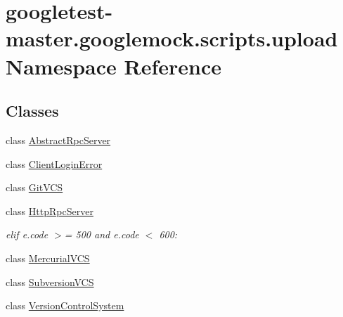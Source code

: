 \hypertarget{namespacegoogletest-master_1_1googlemock_1_1scripts_1_1upload}{}\section{googletest-\/master.googlemock.\+scripts.\+upload Namespace Reference}
\label{namespacegoogletest-master_1_1googlemock_1_1scripts_1_1upload}
\subsection*{Classes}
\begin{DoxyCompactItemize}
\item 
class \mbox{\hyperlink{classgoogletest-master_1_1googlemock_1_1scripts_1_1upload_1_1_abstract_rpc_server}{Abstract\+Rpc\+Server}}
\item 
class \mbox{\hyperlink{classgoogletest-master_1_1googlemock_1_1scripts_1_1upload_1_1_client_login_error}{Client\+Login\+Error}}
\item 
class \mbox{\hyperlink{classgoogletest-master_1_1googlemock_1_1scripts_1_1upload_1_1_git_v_c_s}{Git\+V\+CS}}
\item 
class \mbox{\hyperlink{classgoogletest-master_1_1googlemock_1_1scripts_1_1upload_1_1_http_rpc_server}{Http\+Rpc\+Server}}
\begin{DoxyCompactList}\small\item\em elif e.\+code $>$= 500 and e.\+code $<$ 600\+: \end{DoxyCompactList}\item 
class \mbox{\hyperlink{classgoogletest-master_1_1googlemock_1_1scripts_1_1upload_1_1_mercurial_v_c_s}{Mercurial\+V\+CS}}
\item 
class \mbox{\hyperlink{classgoogletest-master_1_1googlemock_1_1scripts_1_1upload_1_1_subversion_v_c_s}{Subversion\+V\+CS}}
\item 
class \mbox{\hyperlink{classgoogletest-master_1_1googlemock_1_1scripts_1_1upload_1_1_version_control_system}{Version\+Control\+System}}
\end{DoxyCompactItemize}
